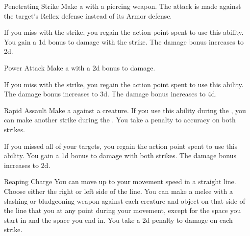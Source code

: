{            \begin{ability}{Penetrating Strike}
                Make a  with a piercing weapon.
                The attack is made against the target's Reflex defense instead of its Armor defense.

                \rankline
                 If you miss with the strike, you regain the action point spent to use this ability.
                 You gain a \plus1d bonus to damage with the strike.
                 The damage bonus increases to \plus2d.
            \end{ability}

            \begin{ability}{Power Attack}
                Make a  with a \plus2d bonus to damage.

                \rankline
                 If you miss with the strike, you regain the action point spent to use this ability.
                 The damage bonus increases to \plus3d.
                 The damage bonus increases to \plus4d.
            \end{ability}

            \begin{ability}{Rapid Assault}
                Make a  against a creature.
                If you use this ability during the , you can make another strike during the .
                You take a  penalty to accuracy on both strikes.

                \rankline
                 If you missed all of your targets, you regain the action point spent to use this ability.
                 You gain a \plus1d bonus to damage with both strikes.
                 The damage bonus increases to \plus2d.
            \end{ability}

            \begin{ability}{Reaping Charge}
                You can move up to your movement speed in a straight line.
                Choose either the right or left side of the line.
                You can make a melee  with a slashing or bludgeoning weapon against each creature and object on that side of the line that you  at any point during your movement, except for the space you start in and the space you end in.
                You take a \minus2d penalty to damage on each strike.


\end{ability}}
